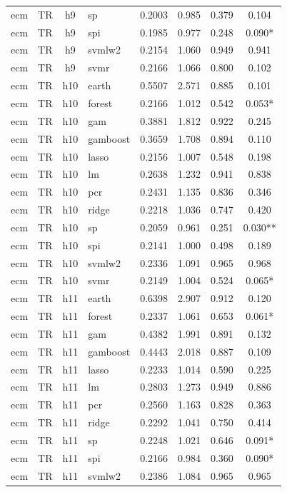 \begin{ThreePartTable}
\begin{longtable}[t]{llclcccc}
ecm & TR & h9 & sp & 0.2003 & 0.985 & 0.379 & 0.104\\
ecm & TR & h9 & spi & 0.1985 & 0.977 & 0.248 & 0.090*\\
ecm & TR & h9 & svmlw2 & 0.2154 & 1.060 & 0.949 & 0.941\\
ecm & TR & h9 & svmr & 0.2166 & 1.066 & 0.800 & 0.102\\
\addlinespace
ecm & TR & h10 & earth & 0.5507 & 2.571 & 0.885 & 0.101\\
ecm & TR & h10 & forest & 0.2166 & 1.012 & 0.542 & 0.053*\\
ecm & TR & h10 & gam & 0.3881 & 1.812 & 0.922 & 0.245\\
ecm & TR & h10 & gamboost & 0.3659 & 1.708 & 0.894 & 0.110\\
ecm & TR & h10 & lasso & 0.2156 & 1.007 & 0.548 & 0.198\\
ecm & TR & h10 & lm & 0.2638 & 1.232 & 0.941 & 0.838\\
ecm & TR & h10 & pcr & 0.2431 & 1.135 & 0.836 & 0.346\\
ecm & TR & h10 & ridge & 0.2218 & 1.036 & 0.747 & 0.420\\
ecm & TR & h10 & sp & 0.2059 & 0.961 & 0.251 & 0.030**\\
ecm & TR & h10 & spi & 0.2141 & 1.000 & 0.498 & 0.189\\
ecm & TR & h10 & svmlw2 & 0.2336 & 1.091 & 0.965 & 0.968\\
ecm & TR & h10 & svmr & 0.2149 & 1.004 & 0.524 & 0.065*\\
\addlinespace
ecm & TR & h11 & earth & 0.6398 & 2.907 & 0.912 & 0.120\\
ecm & TR & h11 & forest & 0.2337 & 1.061 & 0.653 & 0.061*\\
ecm & TR & h11 & gam & 0.4382 & 1.991 & 0.891 & 0.132\\
ecm & TR & h11 & gamboost & 0.4443 & 2.018 & 0.887 & 0.109\\
ecm & TR & h11 & lasso & 0.2233 & 1.014 & 0.590 & 0.225\\
ecm & TR & h11 & lm & 0.2803 & 1.273 & 0.949 & 0.886\\
ecm & TR & h11 & pcr & 0.2560 & 1.163 & 0.828 & 0.363\\
ecm & TR & h11 & ridge & 0.2292 & 1.041 & 0.750 & 0.414\\
ecm & TR & h11 & sp & 0.2248 & 1.021 & 0.646 & 0.091*\\
ecm & TR & h11 & spi & 0.2166 & 0.984 & 0.360 & 0.090*\\
ecm & TR & h11 & svmlw2 & 0.2386 & 1.084 & 0.965 & 0.965\\

\end{longtable}
\end{ThreePartTable}
